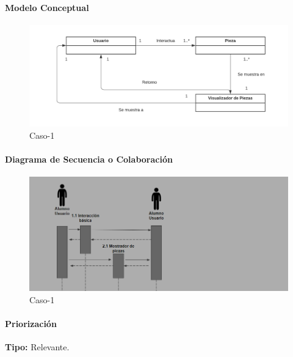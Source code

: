 \paragraph{Modelo Conceptual}

\begin{figure}[H]
\centerline{\includegraphics[width=15cm]{imgs/ModeloConceptualCaso_3_3.png}}
\caption{Caso-1}
\label{fig}
\end{figure}


\paragraph{Diagrama de Secuencia o Colaboración}

\begin{figure}[H]
\centerline{\includegraphics[width=15cm]{imgs/CasoUso_3_2.PNG}}
\caption{Caso-1}
\label{fig}
\end{figure}

\paragraph{Priorización}
{\textbf {Tipo:}}
Relevante.